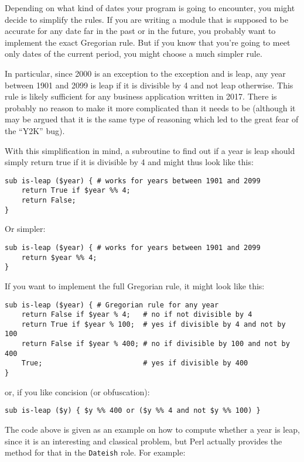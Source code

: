 Depending on what kind of dates your program is going to 
encounter, you might decide to simplify the rules. If 
you are writing a module that is supposed to be accurate for any 
date far in the past or in the future, you probably want 
to implement the exact Gregorian rule. But if you know 
that you're going to meet only dates of the current 
period, you might choose a much simpler rule.

In particular, since 2000 is an exception to the exception 
and is leap, any year between 1901 and 2099 is leap if it 
is divisible by 4 and not leap otherwise. This rule is 
likely sufficient for any business application 
written in 2017. There is probably no reason to make it 
more complicated than it needs to be (although it may be 
argued that it is the same type of reasoning which led to 
the great fear of the ``Y2K'' bug). 

With this simplification in mind, a subroutine to find out 
if a year is leap should simply return true if it is 
divisible by 4 and might thus look like this:

\begin{verbatim}
sub is-leap ($year) { # works for years between 1901 and 2099
    return True if $year %% 4; 
    return False;
}
\end{verbatim}

Or simpler:

\begin{verbatim}
sub is-leap ($year) { # works for years between 1901 and 2099
    return $year %% 4; 
}
\end{verbatim}

If you want to implement the full Gregorian rule, it might 
look like this:

\begin{verbatim}
sub is-leap ($year) { # Gregorian rule for any year
    return False if $year % 4;   # no if not divisible by 4
    return True if $year % 100;  # yes if divisible by 4 and not by 100
    return False if $year % 400; # no if divisible by 100 and not by 400
    True;                        # yes if divisible by 400
}
\end{verbatim}

or, if you like concision (or obfuscation):
\begin{verbatim}
sub is-leap ($y) { $y %% 400 or ($y %% 4 and not $y %% 100) }
\end{verbatim}

The code above is given as an example on how to compute 
whether a year is leap, since it is an interesting and 
classical problem, but Perl actually provides the method for that 
in the {\tt Dateish} role. For example:

